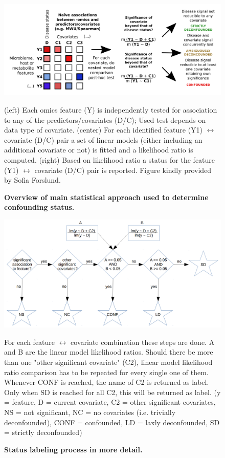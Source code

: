 \documentclass{article}\usepackage[]{graphicx}\usepackage[usenames,dvipsnames]{color}
\begin{document}
\begin{figure}[H]
	\includegraphics[width=\linewidth]{Figures/statistics.png}
	\caption{\bf Overview of main statistical approach used to determine confounding status.}
	(left) Each omics feature (Y) is independently tested for association to any of the predictors/covariates (D/C); Used test depends on data type of covariate. 
	(center) For each identified feature (Y1) $\leftrightarrow$ covariate (D/C) pair a set of linear models (either including an additional covariate or not) is fitted and a likelihood ratio is computed. 
	(right) Based on likelihood ratio a status for the feature (Y1) $\leftrightarrow$ covariate (D/C) pair is reported. Figure kindly provided by Sofia Forslund.
	\label{fig:statistics}
\end{figure}

\begin{figure}[H]
	\includegraphics[width=\linewidth]{Figures/flowChartDecision.png}
	\caption{\bf Status labeling process in more detail.}
	For each feature $\leftrightarrow$ covariate combination these steps are done. A and B are the linear model likelihood ratios. Should there be more than one "other significant covariate" (C2), linear model likelihood ratio comparison has to be repeated for every single one of them. Whenever CONF is reached, the name of C2 is returned as label. Only when SD is reached for all C2, this will be returned as label.
	(y = feature, D = current covariate, C2 = other significant covariates, NS = not significant, NC = no covariates (i.e. trivially deconfounded), CONF = confounded, LD = laxly deconfounded, SD = strictly deconfounded)
	\label{fig:flowChart}
\end{figure}
\end{document}
